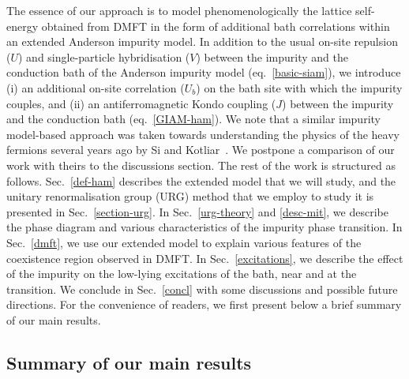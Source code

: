 The essence of our approach is to model phenomenologically the lattice self-energy obtained from DMFT in the form of additional bath correlations within an extended Anderson impurity model.
In addition to the usual on-site repulsion ($U$) and single-particle hybridisation ($V$) between the impurity and the conduction bath of the Anderson impurity model (eq.~\eqref{basic-siam}), we introduce (i) an additional on-site correlation ($U_{b}$) on the bath site with which the impurity couples, and (ii) an antiferromagnetic Kondo coupling ($J$) between the impurity and the conduction bath (eq.~\eqref{GIAM-ham}). 
We note that a similar impurity model-based approach was taken towards understanding the physics of the heavy fermions several years ago by Si and Kotliar~\cite{si_kotliar_1993,kotliarsi_1993}. 
We postpone a comparison of our work with theirs to the discussions section. The rest of the work is structured as follows. Sec.~\eqref{def-ham} describes the extended model that we will study, and the unitary renormalisation group (URG) method that we employ to study it is presented in Sec.~\eqref{section-urg}. In Sec.~\eqref{urg-theory} and \eqref{desc-mit}, we describe the phase diagram and various characteristics of the impurity phase transition. In Sec.~\eqref{dmft}, we use our extended model to explain various features of the coexistence region observed in DMFT. In Sec.~\eqref{excitations}, we describe the effect of the impurity on the low-lying excitations of the bath, near and at the transition. We conclude in Sec.~\eqref{concl} with some discussions and possible future directions. For the convenience of readers, we first present below a brief summary of our main results.

\subsection*{\bf Summary of our main results}


